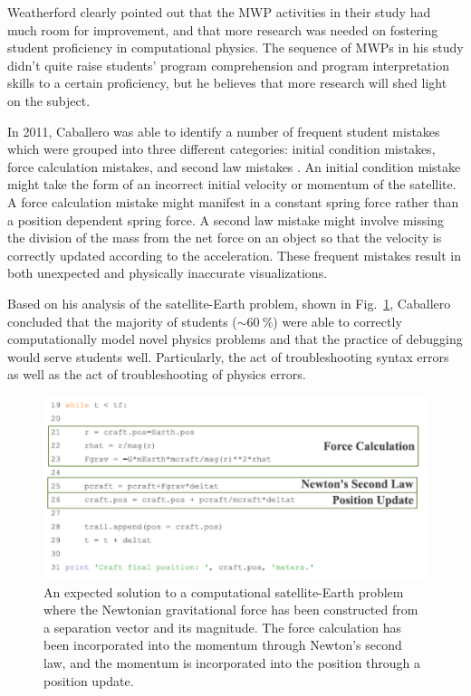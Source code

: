 \documentclass{msuphddissertation}
\begin{document}
\begin{doublespace}
Weatherford clearly pointed out that the MWP activities in their study had much room for improvement, and that more research was needed on fostering student proficiency in computational physics.  The sequence of MWPs in his study didn't quite raise students' program comprehension and program interpretation skills to a certain proficiency, but he believes that more research will shed light on the subject.

In 2011, Caballero was able to identify a number of frequent student mistakes which were grouped into three different categories: initial condition mistakes, force calculation mistakes, and second law mistakes \cite{Caballero2011}.  An initial condition mistake might take the form of an incorrect initial velocity or momentum of the satellite.  A force calculation mistake might manifest in a constant spring force rather than a position dependent spring force.  A second law mistake might involve missing the division of the mass from the net force on an object so that the velocity is correctly updated according to the acceleration.  These frequent mistakes result in both unexpected and physically inaccurate visualizations.

Based on his analysis of the satellite-Earth problem, shown in Fig.~\ref{CH2:Caballero}, Caballero concluded that the majority of students ($\sim\SI{60}{\percent}$) were able to correctly computationally model novel physics problems and that the practice of debugging would serve students well.  Particularly, the act of troubleshooting syntax errors as well as the act of troubleshooting of physics errors.

\begin{figure}\center
\includegraphics[scale=0.8]{images/CH2Caballero.pdf}
\caption{An expected solution to a computational satellite-Earth problem where the Newtonian gravitational force has been constructed from a separation vector and its magnitude.  The force calculation has been incorporated into the momentum through Newton's second law, and the momentum is incorporated into the position through a position update.}\label{CH2:Caballero}
\end{figure}


\end{doublespace}
\end{document}
